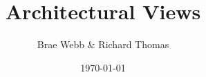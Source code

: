 \documentclass{csse4400}
\title{Architectural Views}
\author{Brae Webb \& Richard Thomas}
\date{\today}
\begin{document}
\makecover





\end{document}
